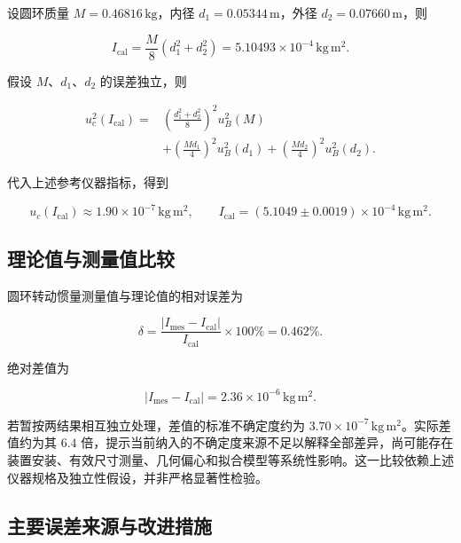 \documentclass[UTF8]{ctexart}
\begin{document}
设圆环质量 $M=0.46816\,\mathrm{kg}$，内径 $d_1=0.05344\,\mathrm m$，外径 $d_2=0.07660\,\mathrm m$，则

\begin{equation}
 I_{\mathrm{cal}}=\frac M8(d_1^2+d_2^2)
 =5.10493\times10^{-4}\,\mathrm{kg\,m^2}.
\end{equation}

假设 $M$、$d_1$、$d_2$ 的误差独立，则

\begin{equation}
 \begin{aligned}
 u_c^2(I_{\mathrm{cal}})={}&
 \left(\frac{d_1^2+d_2^2}{8}\right)^2u_B^2(M)\\
 &+\left(\frac{Md_1}{4}\right)^2u_B^2(d_1)
 +\left(\frac{Md_2}{4}\right)^2u_B^2(d_2).
 \end{aligned}
\end{equation}

代入上述参考仪器指标，得到

\begin{equation}
 u_c(I_{\mathrm{cal}})\approx1.90\times10^{-7}\,\mathrm{kg\,m^2},\qquad
 \boxed{I_{\mathrm{cal}}=(5.1049\pm0.0019)\times10^{-4}\,\mathrm{kg\,m^2}}.
\end{equation}

\subsection{理论值与测量值比较}

圆环转动惯量测量值与理论值的相对误差为

\begin{equation}
 \delta=\frac{|I_{\mathrm{mes}}-I_{\mathrm{cal}}|}{I_{\mathrm{cal}}}\times100\%
 =\boxed{0.462\%}.
\end{equation}

绝对差值为

\begin{equation}
 |I_{\mathrm{mes}}-I_{\mathrm{cal}}|
 =2.36\times10^{-6}\,\mathrm{kg\,m^2}.
\end{equation}

若暂按两结果相互独立处理，差值的标准不确定度约为 $3.70\times10^{-7}\,\mathrm{kg\,m^2}$。实际差值约为其 $6.4$ 倍，提示当前纳入的不确定度来源不足以解释全部差异，尚可能存在装置安装、有效尺寸测量、几何偏心和拟合模型等系统性影响。这一比较依赖上述仪器规格及独立性假设，并非严格显著性检验。

\subsection{主要误差来源与改进措施}
\end{document}
